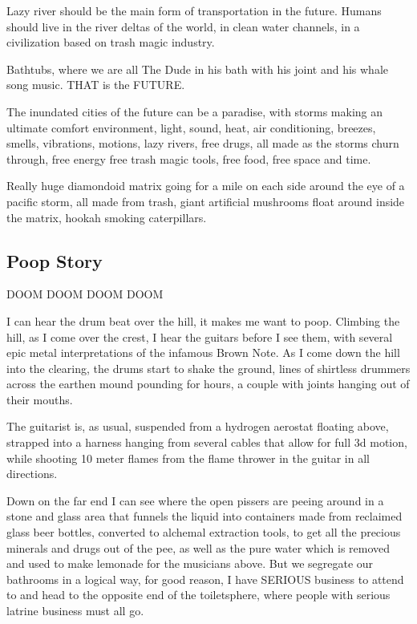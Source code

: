 Lazy river should be the main form of transportation in the future.
Humans should live in the river deltas of the world, in clean water
channels, in a civilization based on trash magic industry.

Bathtubs, where we are all The Dude in his bath with his joint and his
whale song music. THAT is the FUTURE.

The inundated cities of the future can be a paradise, with storms making
an ultimate comfort environment, light, sound, heat, air conditioning,
breezes, smells, vibrations, motions, lazy rivers, free drugs, all made
as the storms churn through, free energy free trash magic tools, free
food, free space and time.

Really huge diamondoid matrix going for a mile on each side around the
eye of a pacific storm, all made from trash, giant artificial mushrooms
float around inside the matrix, hookah smoking caterpillars.

\subsection{Poop Story}\label{poop-story}

DOOM DOOM DOOM DOOM

I can hear the drum beat over the hill, it makes me want to poop.
Climbing the hill, as I come over the crest, I hear the guitars before I
see them, with several epic metal interpretations of the infamous Brown
Note. As I come down the hill into the clearing, the drums start to
shake the ground, lines of shirtless drummers across the earthen mound
pounding for hours, a couple with joints hanging out of their mouths.

The guitarist is, as usual, suspended from a hydrogen aerostat floating
above, strapped into a harness hanging from several cables that allow
for full 3d motion, while shooting 10 meter flames from the flame
thrower in the guitar in all directions.

Down on the far end I can see where the open pissers are peeing around
in a stone and glass area that funnels the liquid into containers made
from reclaimed glass beer bottles, converted to alchemal extraction
tools, to get all the precious minerals and drugs out of the pee, as
well as the pure water which is removed and used to make lemonade for
the musicians above. But we segregate our bathrooms in a logical way,
for good reason, I have SERIOUS business to attend to and head to the
opposite end of the toiletsphere, where people with serious latrine
business must all go.

